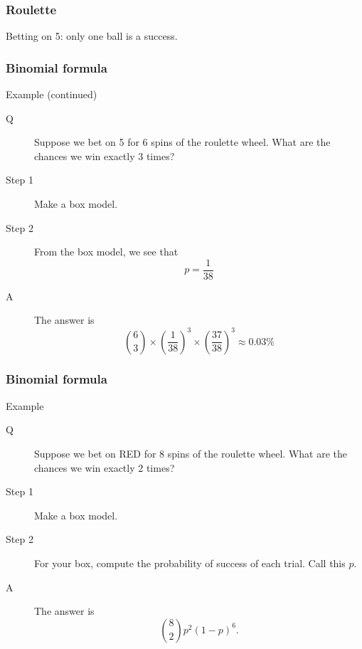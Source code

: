 \documentclass[handout]{beamer}
\begin{document}
   \begin{frame}
   \frametitle{Roulette}
   \begin{center}
   \end{center}
   Betting on {\color{red} 5}: only one ball is a success.
   \end{frame}


   \begin{frame} \frametitle{Binomial formula}

   \begin{block}
   {Example (continued)}
   \begin{description}

   \item[Q] Suppose we bet on {\color{red} 5} for 6 spins of the roulette wheel.
   What are the chances we win exactly 3 times?

   \item[Step 1] Make a box model.
   \item[Step 2] From the box model, we see that
   $$
   p = \frac{1}{38}
   $$
   \item[A] The answer is
   $$
   \binom{6}{3} \times \left(\frac{1}{38}\right)^3 \times \left( \frac{37}{38} \right)^3 \approx 0.03\%
   $$
   \end{description}
   \end{block}
   \end{frame}


   \begin{frame} \frametitle{Binomial formula}

   \begin{block}
   {Example}
   \begin{description}

   \item[Q] Suppose we bet on {\color{red} RED} for 8 spins of the roulette wheel.
   What are the chances we win exactly 2 times?

   \item[Step 1] Make a box model.
   \item[Step 2] For your box, compute the probability of success of each trial. Call this $p$.
   \item[A] The answer is
   $$
   \binom{8}{2} p^2 (1-p)^6.
   $$
   \end{description}
   \end{block}
   \end{frame}
\end{document}
